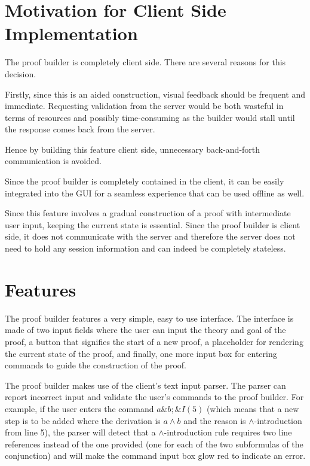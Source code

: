 \documentclass[11pt,twoside,a4paper]{report}
\begin{document}
\section{Motivation for Client Side Implementation}
The proof builder is completely client side. There are several reasons for this decision. 

Firstly, since this is an aided construction, visual feedback should be frequent and immediate. Requesting validation from the server would be both wasteful in terms of resources and possibly time-consuming as the builder would stall until the response comes back from the server. 

Hence by building this feature client side, unnecessary back-and-forth communication is avoided. 

Since the proof builder is completely contained in the client, it can be easily integrated into the GUI for a seamless experience that can be used offline as well. 

Since this feature involves a gradual construction of a proof with intermediate user input, keeping the current state is essential. Since the proof builder is client side, it does not communicate with the server and therefore the server does not need to hold any session information and can indeed be completely stateless.

\section{Features}
The proof builder features a very simple, easy to use interface. The interface is made of two input fields where the user can input the theory and goal of the proof, a button that signifies the start of a new proof, a placeholder for rendering the current state of the proof, and finally, one more input box for entering commands to guide the construction of the proof.

The proof builder makes use of the client's text input parser. The parser can report incorrect input and validate the user's commands to the proof builder. For example, if the user enters the command $a\&b; \&I(5)$ (which means that a new step is to be added where the derivation is $a\wedge b$ and the reason is $\wedge$-introduction from line 5), the parser will detect that a $\wedge$-introduction rule requires two line references instead of the one provided (one for each of the two subformulas of the conjunction) and will make the command input box glow red to indicate an error.
\end{document}

